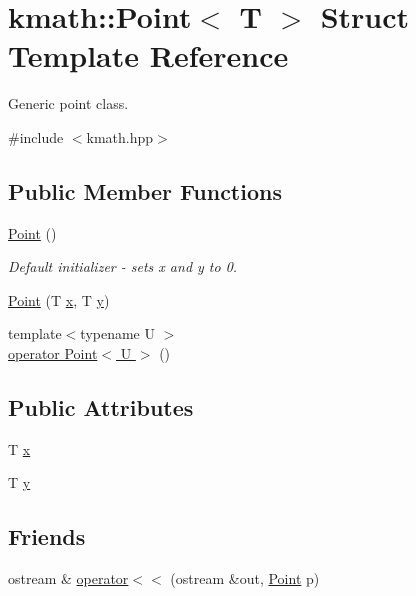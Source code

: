 \hypertarget{structkmath_1_1_point}{\section{kmath\-:\-:Point$<$ T $>$ Struct Template Reference}
\label{structkmath_1_1_point}
}


Generic point class.  




{\ttfamily \#include $<$kmath.\-hpp$>$}

\subsection*{Public Member Functions}
\begin{DoxyCompactItemize}
\item 
\hyperlink{structkmath_1_1_point_ac63797a27504bd994b0a5756ffc37428}{Point} ()
\begin{DoxyCompactList}\small\item\em Default initializer -\/ sets {\ttfamily x} and {\ttfamily y} to 0. \end{DoxyCompactList}\item 
\hyperlink{structkmath_1_1_point_a174f5ab875237f2d5c443fef527e2804}{Point} (T \hyperlink{structkmath_1_1_point_a367f7e04a97fde0889e5dea495d98acd}{x}, T \hyperlink{structkmath_1_1_point_a9d69fcd8c019e361cce763e45b8b1698}{y})
\item 
{\footnotesize template$<$typename U $>$ }\\\hyperlink{structkmath_1_1_point_a1e9c44d82f35cb33fde79c7de953832a}{operator Point$<$ U $>$} ()
\end{DoxyCompactItemize}
\subsection*{Public Attributes}
\begin{DoxyCompactItemize}
\item 
T \hyperlink{structkmath_1_1_point_a367f7e04a97fde0889e5dea495d98acd}{x}
\item 
T \hyperlink{structkmath_1_1_point_a9d69fcd8c019e361cce763e45b8b1698}{y}
\end{DoxyCompactItemize}
\subsection*{Friends}
\begin{DoxyCompactItemize}
\item 
ostream \& \hyperlink{structkmath_1_1_point_ac6ce84350ccb7814a8ebbc3b93fa0fcf}{operator$<$$<$} (ostream \&out, \hyperlink{structkmath_1_1_point}{Point} p)
\end{DoxyCompactItemize}


